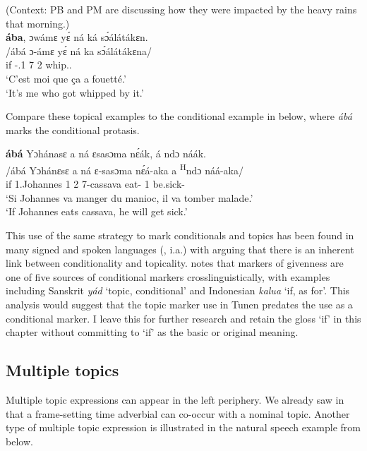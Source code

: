 \documentclass[output=paper,colorlinks,citecolor=brown
]{langscibook}
\begin{document}
\z
\largerpage[-1]\pagebreak
\ea
(Context: PB and PM are discussing how they were impacted by the heavy rains that morning.) \\ 
\glll
{\db}\textbf{ába}, ɔwámɛ yɛ́ ná ká sɔ́álátákɛn. \\
/ábá ɔ-ámɛ yɛ́ ná ka sɔ́álátákɛna/ \\
{\db}if \PREP{}-\PRO{}.1{} 7\SM{} \PST{}2 \AND{} whip.\DUR{}.\REP{} \\
\glt
`C'est moi que ça a fouetté.' \\ `It's me who got whipped by it.' \jambox*{[PM 1784] }

\z

Compare these topical examples to the conditional example in  below, where \textit{ábá} marks the conditional protasis.

\ea
\label{condgetsick}
\glll
{\db}\textbf{ábá}	Yɔhánasɛ	a ná ɛsasɔma nɛ́ák, á ndɔ	náák. \\
/ábá	Yɔhánɛsɛ	a ná	ɛ-sasɔma	nɛ́á-aka a \textsuperscript{H}ndɔ	náá-aka/ \\
{\db}if	1.Johannes	1\SM{} \PST{}2{} 7-cassava eat-\DUR{} 1\SM{} \PRS{} be.sick-\DUR{} \\
\glt
`Si Johannes va manger du manioc, il va tomber malade.' \\ `If Johannes eats cassava, he will get sick.' \jambox*{[PM 2288] }

\z

This use of the same strategy to mark conditionals and topics has been found in many signed and spoken languages (\citealt{Haiman1978, Traugott1985, Janzen1999}, i.a.) with \citet{Haiman1978} arguing that there is an inherent link between conditionality and topicality. \citet[292]{Traugott1985} notes that markers of givenness are one of five sources of conditional markers crosslinguistically, with examples including Sanskrit \textit{yád} `topic, conditional' and Indonesian \textit{kalua} `if, as for'. This analysis would suggest that the topic marker use in Tunen predates the use as a conditional marker. I leave this for further research and retain the gloss `if' in this chapter without committing to `if' as the basic or original meaning.

\subsection{Multiple topics}
Multiple topic expressions can appear in the left periphery. We already saw in  that a frame-setting time adverbial can co-occur with a nominal topic. Another type of multiple topic expression is illustrated in the natural speech example from  below.%
\largerpage[-1]\pagebreak
\end{document}
